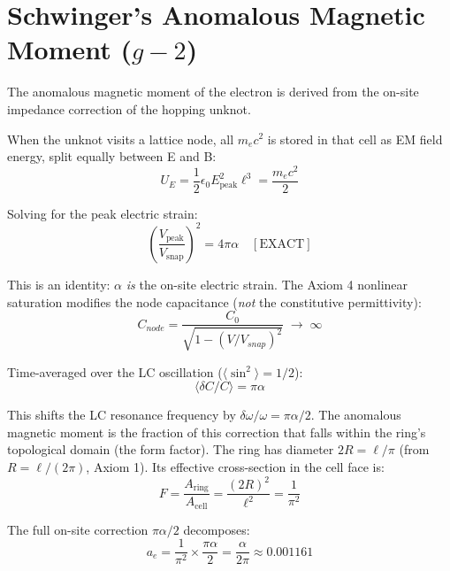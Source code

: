 \section{Schwinger's Anomalous Magnetic Moment ($g-2$)}
\label{sec:schwinger_leading_order_g_minus_2}

The anomalous magnetic moment of the electron is derived from the on-site impedance correction of the hopping unknot.

When the unknot visits a lattice node, all $m_e c^2$ is stored in that cell as EM field energy, split equally between E and B:
\begin{equation}
    U_E = \frac{1}{2}\epsilon_0 E_{\text{peak}}^2 \ell^3 = \frac{m_e c^2}{2}
\end{equation}

Solving for the peak electric strain:
\begin{equation}
    \left(\frac{V_{\text{peak}}}{V_{\text{snap}}}\right)^2 = 4\pi\alpha \quad [\text{EXACT}]
\end{equation}

This is an identity: $\alpha$ \textit{is} the on-site electric strain. The Axiom 4 nonlinear saturation modifies the node capacitance (\emph{not} the constitutive permittivity):
\begin{equation}
    C_{node} = \frac{C_0}{\sqrt{1 - (V/V_{snap})^2}} \;\to\; \infty
\end{equation}

Time-averaged over the LC oscillation ($\langle\sin^2\rangle = 1/2$):
\begin{equation}
    \langle\delta C / C\rangle = \pi\alpha
\end{equation}

This shifts the LC resonance frequency by $\delta\omega/\omega = \pi\alpha/2$. The anomalous magnetic moment is the fraction of this correction that falls within the ring's topological domain (the form factor). The ring has diameter $2R = \ell/\pi$ (from $R = \ell/(2\pi)$, Axiom 1). Its effective cross-section in the cell face is:
\begin{equation}
    F = \frac{A_{\text{ring}}}{A_{\text{cell}}} = \frac{(2R)^2}{\ell^2} = \frac{1}{\pi^2}
\end{equation}

The full on-site correction $\pi\alpha/2$ decomposes:
\begin{equation}
    a_e = \frac{1}{\pi^2} \times \frac{\pi\alpha}{2} = \boxed{\frac{\alpha}{2\pi}} \approx 0.001161
\end{equation}

